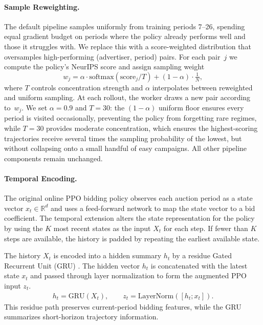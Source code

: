 \documentclass{article}
\begin{document}
\paragraph{Sample Reweighting.}
The default pipeline samples uniformly from training periods 7--26, spending equal
gradient budget on periods where the policy already performs well and those it struggles
with. We replace this with a score-weighted distribution that oversamples
high-performing (advertiser, period) pairs. For each pair~$j$ we compute the policy's
NeurIPS score and assign sampling weight
%
\begin{equation}
  w_j = \alpha \cdot \mathrm{softmax}(\mathrm{score}_j / T)
      + (1 - \alpha) \cdot \tfrac{1}{N},
\end{equation}
%
where $T$ controls concentration strength and $\alpha$ interpolates between reweighted
and uniform sampling. At each rollout, the worker draws a new pair according to~$w_j$.
We set $\alpha{=}0.9$ and $T{=}30$: the $(1{-}\alpha)$ uniform floor ensures every
period is visited occasionally, preventing the policy from forgetting rare regimes, while $T{=}30$ provides moderate concentration, which ensures the highest-scoring trajectories
receive several times the sampling probability of the lowest, but without collapsing
onto a small handful of easy campaigns. All other pipeline components remain unchanged.

\paragraph{Temporal Encoding.}

The original online PPO bidding policy observes each auction period as a
state vector $x_t \in \mathbb{R}^{d}$ and uses a feed-forward 
network to map the state vector to a bid coefficient.
The temporal extension alters the state representation for the policy
by using the $K$ most recent states as the input $X_t$ for each step.
If fewer than $K$ steps are available, the history is padded by repeating the earliest
available state.

The history $X_t$ is encoded into a hidden summary $h_t$ by a 
residue Gated Recurrent Unit (GRU) \cite{cho-etal-2014-learning}.
The hidden vector $h_t$ is concatenated with the latest state $x_t$ and 
passed through layer normalization to form the augmented PPO input $z_t$.
\begin{align}
    h_t = \mathrm{GRU}(X_t), \qquad
    z_t = \mathrm{LayerNorm}([h_t; x_t]).
\end{align}
This residue path preserves current-period bidding features, while
the GRU summarizes short-horizon trajectory information.
\end{document}
